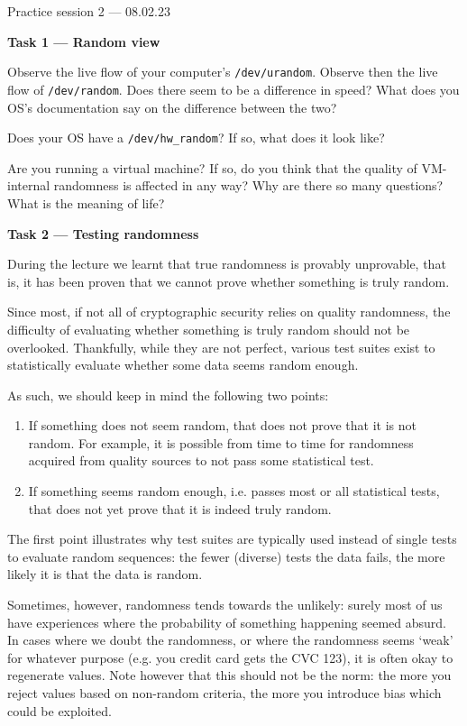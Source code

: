 \documentclass{practice}
\begin{document}
\begin{center}
Practice session 2 --- 08.02.23
\end{center}

\textbf{Task 1 --- Random view}

Observe the live flow of your computer's \texttt{/dev/urandom}.
Observe then the live flow of \texttt{/dev/random}.
Does there seem to be a difference in speed?
What does you OS's documentation say on the difference between the two?

Does your OS have a \texttt{/dev/hw\_random}?
If so, what does it look like?

Are you running a virtual machine?
If so, do you think that the quality of VM-internal randomness is affected in any way?
Why are there so many questions?
What is the meaning of life?

\textbf{Task 2 --- Testing randomness}

During the lecture we learnt that true randomness is provably unprovable, that is, it has been proven that we cannot prove whether something is truly random.

Since most, if not all of cryptographic security relies on quality randomness, the difficulty of evaluating whether something is truly random should not be overlooked.
Thankfully, while they are not perfect, various test suites exist to statistically evaluate whether some data seems random enough.

As such, we should keep in mind the following two points:
\begin{enumerate}
    \item If something does not seem random, that does not prove that it is not random.
    For example, it is possible from time to time for randomness acquired from quality sources to not pass some statistical test.

    \item If something seems random enough, i.e. passes most or all statistical tests, that does not yet prove that it is indeed truly random.
\end{enumerate}

The first point illustrates why test suites are typically used instead of single tests to evaluate random sequences: the fewer (diverse) tests the data fails, the more likely it is that the data is random.

Sometimes, however, randomness tends towards the unlikely: surely most of us have experiences where the probability of something happening seemed absurd.
In cases where we doubt the randomness, or where the randomness seems `weak' for whatever purpose (e.g. you credit card gets the CVC 123), it is often okay to regenerate values.
Note however that this should not be the norm: the more you reject values based on non-random criteria, the more you introduce bias which could be exploited.
\end{document}
